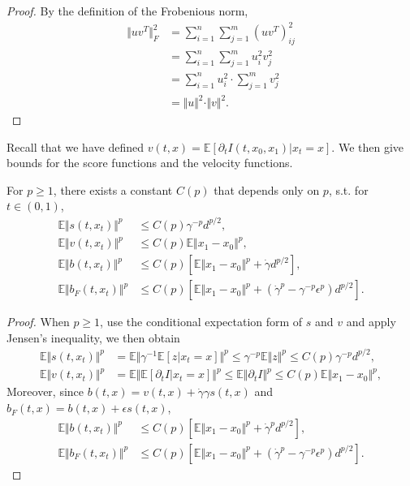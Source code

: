 \begin{proof} By the definition of the Frobenious norm,
    $$\begin{aligned}
        \Vert uv^T\Vert_F^2&=\sum_{i=1}^n\sum_{j=1}^m(uv^T)_{ij}^2\\
        &=\sum_{i=1}^n\sum_{j=1}^mu_i^2v_j^2\\
        &=\sum_{i=1}^nu_i^2\cdot\sum_{j=1}^mv_j^2\\
        &=\Vert u\Vert^2\cdot\Vert v\Vert^2.
    \end{aligned}$$
\end{proof}

Recall that we have defined $v(t,x)=\mathbb{E}[\partial_tI(t,x_0,x_1)|x_t=x]$. We then give bounds for the score functions and the velocity functions.

\begin{lemma}
    For $p\ge 1$, there exists a constant $C(p)$ that depends only on $p$, s.t. for $t\in(0,1)$, 
    $$\begin{aligned}
        \mathbb{E}\Vert s(t,x_t)\Vert^p&\le C(p)\gamma^{-p}d^{p/2},\\
        \mathbb{E}\Vert v(t,x_t)\Vert^p&\le C(p)\mathbb{E}\Vert x_1-x_0\Vert^p,\\
        \mathbb{E}\Vert b(t,x_t)\Vert^p&\le C(p)\left[\mathbb{E}\Vert x_1-x_0\Vert^p+\dot{\gamma}d^{p/2}\right],\\
        \mathbb{E}\Vert b_F(t,x_t)\Vert^p&\le C(p)\left[\mathbb{E}\Vert x_1-x_0\Vert^p+(\dot{\gamma}^p-\gamma^{-p}\epsilon^p)d^{p/2}\right].
    \end{aligned}$$
    \label{lem:vsb-bound}
\end{lemma}

\begin{proof}
    When $p\ge 1$, use the conditional expectation form of $s$ and $v$ and apply Jensen's inequality, we then obtain
    $$\begin{aligned}
        \mathbb{E}\Vert s(t,x_t)\Vert^p&=\mathbb{E}\Vert\gamma^{-1}\mathbb{E}[z|x_t=x]\Vert^p\le\gamma^{-p}\mathbb{E}\Vert z\Vert^p\le C(p)\gamma^{-p}d^{p/2},\\
        \mathbb{E}\Vert v(t,x_t)\Vert^p&=\mathbb{E}\Vert\mathbb{E}[\partial_tI|x_t=x]\Vert^p\le\mathbb{E}\Vert\partial_tI\Vert^p\le C(p)\mathbb{E}\Vert x_1-x_0\Vert^p,
    \end{aligned}$$
    Moreover, since $b(t,x)=v(t,x)+\dot{\gamma}\gamma s(t,x)$ and $b_F(t,x)=b(t,x)+\epsilon s(t,x)$,
    $$\begin{aligned}
        \mathbb{E}\Vert b(t,x_t)\Vert^p&\le C(p)\left[\mathbb{E}\Vert x_1-x_0\Vert^p+\dot{\gamma}^pd^{p/2}\right],\\
        \mathbb{E}\Vert b_F(t,x_t)\Vert^p&\le C(p)\left[\mathbb{E}\Vert x_1-x_0\Vert^p+(\dot{\gamma}^p-\gamma^{-p}\epsilon^p)d^{p/2}\right].
    \end{aligned}$$
\end{proof}

